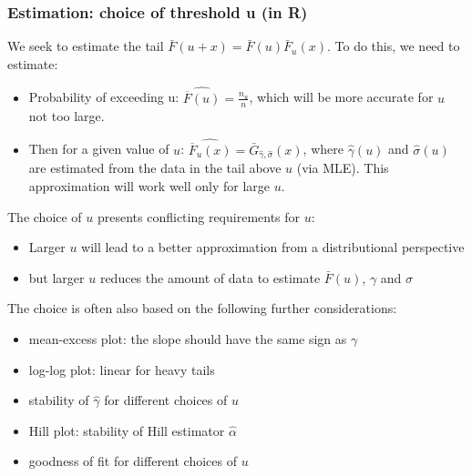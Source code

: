 \documentclass[11pt]{article}
\newcommand{\noi}{\noindent}
\begin{document}
\subsubsection{Estimation: choice of threshold u (in R)}
\noi We seek to estimate the tail $\bar{F}(u+x) = \bar{F}(u)\bar{F}_u(x)$. To do this, we need to estimate:
\begin{itemize}
    \item Probability of exceeding u: $\widehat{\overline{F}(u)} = \frac{n_u}{n}$, which will be more accurate for $u$ not too large.
    \item Then for a given value of $u$: $\widehat{\overline{F}_u(x)} = \bar{G}_{\hat{\gamma}, \hat{\sigma}}(x)$, where $\hat{\gamma}(u)$ and $\hat{\sigma}(u)$ are estimated from the data in the tail above $u$ (via MLE). This approximation will work well only for large $u$.
\end{itemize} \phantom{i}

\noi The choice of $u$ presents conflicting requirements for $u$:
\begin{itemize}
    \item Larger $u$ will lead to a better approximation from a distributional perspective
    \item but larger $u$ reduces the amount of data to estimate $\bar{F}(u)$, $\gamma$ and $\sigma$
\end{itemize} \phantom{i}

\noi The choice is often also based on the following further considerations:
\begin{itemize}
    \item mean-excess plot: the slope should have the same sign as $\gamma$
    \item log-log plot: linear for heavy tails
    \item stability of $\hat{\gamma}$ for different choices of $u$
    \item Hill plot: stability of Hill estimator $\hat{\alpha}$
    \item goodness of fit for different choices of $u$
\end{itemize} \phantom{i}
\end{document}
